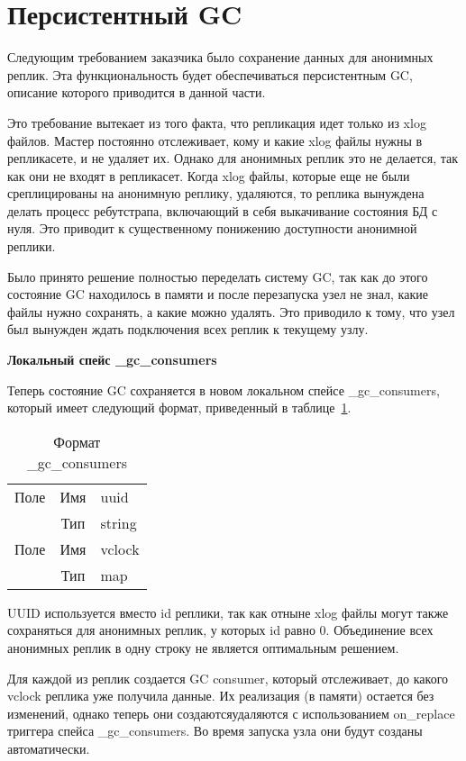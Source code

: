\section{Персистентный GC}

Следующим требованием заказчика было сохранение данных для анонимных реплик. Эта функциональность будет обеспечиваться персистентным GC, описание которого приводится в данной части.

Это требование вытекает из того факта, что репликация идет только из xlog файлов. Мастер постоянно отслеживает, кому и какие xlog файлы нужны в репликасете, и не удаляет их. Однако для анонимных реплик это не делается, так как они не входят в репликасет. Когда xlog файлы, которые еще не были среплицированы на анонимную реплику, удаляются, то реплика вынуждена делать процесс ребутстрапа, включающий в себя выкачивание состояния БД с нуля. Это приводит к существенному понижению доступности анонимной реплики.

Было принято решение полностью переделать систему GC, так как до этого состояние GC находилось в памяти и после перезапуска узел не знал, какие файлы нужно сохранять, а какие можно удалять. Это приводило к тому, что узел был вынужден ждать подключения всех реплик к текущему узлу.

\textbf{Локальный спейс \_gc\_consumers}

Теперь состояние GC сохраняется в новом локальном спейсе \_gc\_consumers, который имеет следующий формат, приведенный в таблице~\ref{tab:tab1}.

\begin{table}
    \centering
    \caption{Формат \_gc\_consumers}
    \begin{tabular}{|r|c|l|}\hline
        Поле & Имя & uuid \\ \hhline{~--}
             & Тип & string \\ \hline
        Поле & Имя & vclock \\ \hhline{~--}
             & Тип & map    \\ \hline
    \end{tabular}
    \label{tab:tab1}
\end{table}

UUID используется вместо id реплики, так как отныне xlog файлы могут также сохраняться для анонимных реплик, у которых id равно 0. Объединение всех анонимных реплик в одну строку не является оптимальным решением.

Для каждой из реплик создается GC consumer, который отслеживает, до какого vclock реплика уже получила данные. Их реализация (в памяти) остается без изменений, однако теперь они создаются\/удаляются с использованием on\_replace триггера спейса \_gc\_consumers. Во время запуска узла они будут созданы автоматически.

